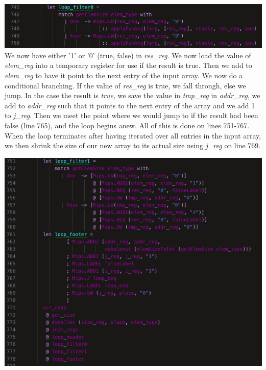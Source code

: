 \includegraphics[width=\linewidth]{Materials/CodeGen/filter1}
We now have either '1' or '0' (true, false) in \textit{res\_reg}. We now load the value of \textit{elem\_reg} into a temporary register for use if the result is true. Then we add to \textit{elem\_reg} to have it point to the next entry of the input array. We now do a conditional branching. If the value of \textit{res\_reg} is true, we fall through, else we jump. In the case the result is \textit{true}, we save the value in \textit{tmp\_reg} in \textit{addr\_reg}, we add to \textit{addr\_reg} such that it points to the next entry of the array and we add 1 to \textit{j\_reg}. Then we meet the point where we would jump to if the result had been false (line 765), and the loop begins anew. All of this is done on lines 751-767. When the loop terminates after having iterated over all entries in the input array, we then shrink the size of our new array to its actual size using \textit{j\_reg} on line 769.

\includegraphics[width=\linewidth]{Materials/CodeGen/filter2}